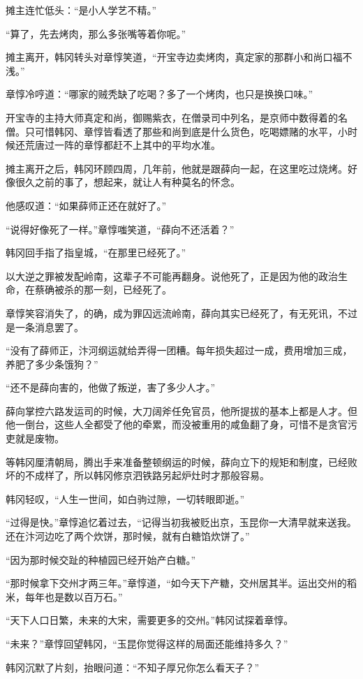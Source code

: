 摊主连忙低头：“是小人学艺不精。”

“算了，先去烤肉，那么多张嘴等着你呢。”

摊主离开，韩冈转头对章惇笑道，“开宝寺边卖烤肉，真定家的那群小和尚口福不浅。”

章惇冷哼道：“哪家的贼秃缺了吃喝？多了一个烤肉，也只是换换口味。”

开宝寺的主持大师真定和尚，御赐紫衣，在僧录司中列名，是京师中数得着的名僧。只可惜韩冈、章惇皆看透了那些和尚到底是什么货色，吃喝嫖赌的水平，小时候还荒唐过一阵的章惇都赶不上其中的平均水准。

摊主离开之后，韩冈环顾四周，几年前，他就是跟薛向一起，在这里吃过烧烤。好像很久之前的事了，想起来，就让人有种莫名的怀念。

他感叹道：“如果薛师正还在就好了。”

“说得好像死了一样。”章惇嗤笑道，“薛向不还活着？”

韩冈回手指了指皇城，“在那里已经死了。”

以大逆之罪被发配岭南，这辈子不可能再翻身。说他死了，正是因为他的政治生命，在蔡确被杀的那一刻，已经死了。

章惇笑容消失了，的确，成为罪囚远流岭南，薛向其实已经死了，有无死讯，不过是一条消息罢了。

“没有了薛师正，汴河纲运就给弄得一团糟。每年损失超过一成，费用增加三成，养肥了多少条饿狗？”

“还不是薛向害的，他做了叛逆，害了多少人才。”

薛向掌控六路发运司的时候，大刀阔斧任免官员，他所提拔的基本上都是人才。但他一倒台，这些人全都受了他的牵累，而没被重用的咸鱼翻了身，可惜不是贪官污吏就是废物。

等韩冈厘清朝局，腾出手来准备整顿纲运的时候，薛向立下的规矩和制度，已经败坏的不成样了，所以韩冈修京泗铁路另起炉灶时才那般容易。

韩冈轻叹，“人生一世间，如白驹过隙，一切转眼即逝。”

“过得是快。”章惇追忆着过去，“记得当初我被贬出京，玉昆你一大清早就来送我。还在汴河边吃了两个炊饼，那时候，就有白糖馅炊饼了。”

“因为那时候交趾的种植园已经开始产白糖。”

“那时候拿下交州才两三年。”章惇道，“如今天下产糖，交州居其半。运出交州的稻米，每年也是数以百万石。”

“天下人口日繁，未来的大宋，需要更多的交州。”韩冈试探着章惇。

“未来？”章惇回望韩冈，“玉昆你觉得这样的局面还能维持多久？”

韩冈沉默了片刻，抬眼问道：“不知子厚兄你怎么看天子？”

